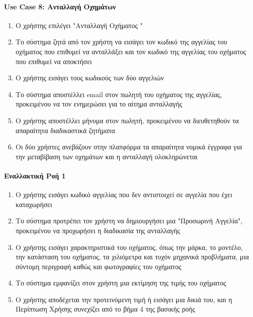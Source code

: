 \documentclass{../ol-softwaremanual}
\begin{document}
	
	\paragraph{\en Use Case 8: \gr  Ανταλλαγή Οχημάτων \gr}
	
	\begin{enumerate}
		\item Ο χρήστης επιλέγει \en"\gr Ανταλλαγή Οχήματος \en"\gr 
		\item Το σύστημα ζητά από τον χρήστη να εισάγει τον κωδικό της αγγελίας του οχήματος που επιθυμεί να ανταλλάξει και τον κωδικό της αγγελίας του οχήματος που επιθυμεί να αποκτήσει 
		\item Ο χρήστης εισάγει τους κωδικούς των δύο αγγελιών 	
		\item Το σύστημα αποστέλλει \en email \gr στον πωλητή του οχήματος της αγγελίας, προκειμένου να τον ενημερώσει για το αίτημα ανταλλαγής
		\item Ο χρήστης αποστέλλει μήνυμα στον πωλητή, προκειμένου να διευθετηθούν τα απαραίτητα διαδικαστικά ζητήματα 
		\item Οι δύο χρήστες ανεβάζουν στην πλατφόρμα τα απαραίτητα νομικά έγγραφα για την μεταβίβαση των οχημάτων και η ανταλλαγή ολοκληρώνεται
	\end{enumerate}
	
	\paragraph{Εναλλακτική Ροή 1}
	
	\begin{enumerate}
		\item Ο χρήστης εισάγει κωδικό αγγελίας που δεν αντιστοιχεί σε αγγελία που έχει καταχωρήσει
		\item Το σύστημα προτρέπει τον χρήστη να δημιουργήσει μια \en"\gr Προσωρινή Αγγελία\en"\gr, προκειμένου να προχωρήσει η διαδικασία της ανταλλαγής
		\item Ο χρήστης εισάγει χαρακτηριστικά του οχήματος, όπως την μάρκα, το μοντέλο, την κατάσταση του οχήματος, τα χιλιόμετρα και τυχόν μηχανικά προβλήματα, μια σύντομη περιγραφή καθώς και φωτογραφίες του οχήματος
		\item Το σύστημα εμφανίζει στον χρήστη μια εκτίμηση της τιμής του οχήματος
		\item Ο χρήστης αποδέχεται την προτεινόμενη τιμή ή εισάγει μια δικιά του, και η Περίπτωση Χρήσης συνεχίζει από το βήμα 4 της βασικής ροής
		
	\end{enumerate}       
	
\end{document}
